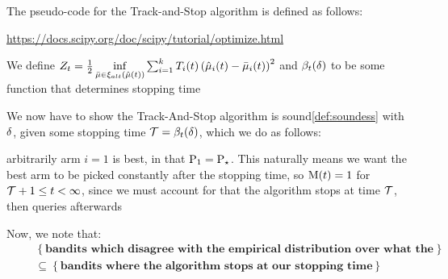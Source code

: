 The pseudo-code for the Track-and-Stop algorithm is defined as follows:


\newcommand{\defineZedTee}[1]{\frac{1}{2}\inf\limits_{\aDifBandit \in \banditSpace_{alt}(\vectorBanditMeans(#1))}
\sum_{i=1}^k T_i(#1) \left( \vectorBanditMeans_i(#1) - \aDifBandit_i(#1) \right)^2}

\url{https://docs.scipy.org/doc/scipy/tutorial/optimize.html}

We define $Z_t = \defineZedTee{t}$ and $\beta_t(\delta)$ to be some function that determines stopping time

We now have to show the Track-And-Stop algorithm is sound\ref{def:soundess} with $\delta$, given some stopping time $\mathcal{T} = \beta_t(\delta)$, which we do as follows:


arbitrarily arm $i=1$ is best, in that $\mathrm{P}_{1} = \mathrm{P}_{\star}$. This naturally means we want the best arm to be picked constantly after the stopping time, so $\mathrm{M}(t) = 1$ for $\mathcal{T} + 1 \leq t < \infty$, since we must account for that the algorithm stops at time $\mathcal{T}$, then queries afterwards

Now, we note that:
\begin{align*}
&\mathrel{\phantom{=}}\left\{\textbf{bandits which disagree with the empirical distribution over what the best arm is} \right\} \\
&\mathrel{\phantom{=}}\subseteq \left\{\textbf{bandits where the algorithm stops at our stopping time}\right\}
\end{align*}

